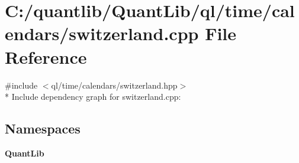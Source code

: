 \section{C\+:/quantlib/\+Quant\+Lib/ql/time/calendars/switzerland.cpp File Reference}
\label{switzerland_8cpp}
{\ttfamily \#include $<$ql/time/calendars/switzerland.\+hpp$>$}\\*
Include dependency graph for switzerland.\+cpp\+:
\subsection*{Namespaces}
\begin{DoxyCompactItemize}
\item 
 {\bf Quant\+Lib}
\end{DoxyCompactItemize}
